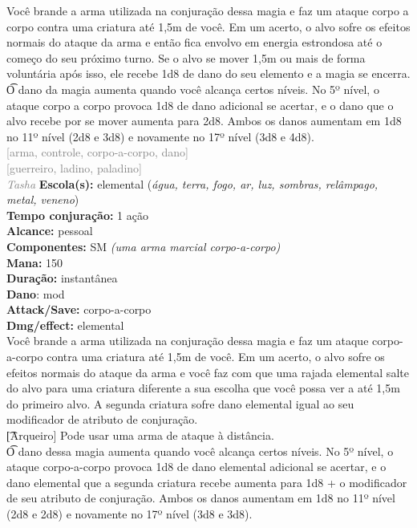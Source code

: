 \documentclass{RPG_Adventure}[2021/10/20]
\begin{document}
{\normalsize Você brande a arma utilizada na conjuração dessa magia e faz um ataque corpo a corpo contra uma criatura até 1,5m de você. Em um acerto, o alvo sofre os efeitos normais do ataque da arma e então fica envolvo em energia estrondosa até o começo do seu próximo turno. Se o alvo se mover 1,5m ou mais de forma voluntária após isso, ele recebe 1d8 de dano do seu elemento e a magia se encerra.\\\t O dano da magia aumenta quando você alcança certos níveis. No 5º nível, o ataque corpo a corpo provoca 1d8 de dano adicional se acertar, e o dano que o alvo recebe por se mover aumenta para 2d8. Ambos os danos aumentam em 1d8 no 11º nível (2d8 e 3d8) e novamente no 17º nível (3d8 e 4d8).\\}
{\scriptsize \textcolor{gray}{[arma, controle, corpo-a-corpo, dano]\\}}
{\scriptsize \textcolor{gray}{[guerreiro, ladino, paladino]\\}}
{\tiny \textcolor{gray}{\textit{Tasha}}}
{\small \t \textbf{Escola(s):} elemental (\textit{água, terra, fogo, ar, luz, sombras, relâmpago, metal, veneno})\\\t \textbf{Tempo conjuração:} 1 ação\\\t \textbf{Alcance:} pessoal\\\t \textbf{Componentes:} SM \textit{(uma arma marcial corpo-a-corpo)}\\\t \textbf{Mana:} 150\\\t \textbf{Duração:} instantânea\\\t \textbf{Dano}: mod\\\t \textbf{Attack/Save:} corpo-a-corpo\\\t \textbf{Dmg/effect:} elemental\\}
{\normalsize Você brande a arma utilizada na conjuração dessa magia e faz um ataque corpo-a-corpo contra uma criatura até 1,5m de você. Em um acerto, o alvo sofre os efeitos normais do ataque da arma e você faz com que uma rajada elemental salte do alvo para uma criatura diferente a sua escolha que você possa ver a até 1,5m do primeiro alvo. A segunda criatura sofre dano elemental igual ao seu modificador de atributo de conjuração.\\\t [Arqueiro] Pode usar uma arma de ataque à distância.\\\t O dano dessa magia aumenta quando você alcança certos níveis. No 5º nível, o ataque corpo-a-corpo provoca 1d8 de dano elemental adicional se acertar, e o dano elemental que a segunda criatura recebe aumenta para 1d8 + o modificador de seu atributo de conjuração. Ambos os danos aumentam em 1d8 no 11º nível (2d8 e 2d8) e novamente no 17º nível (3d8 e 3d8).\\}
\end{document}
